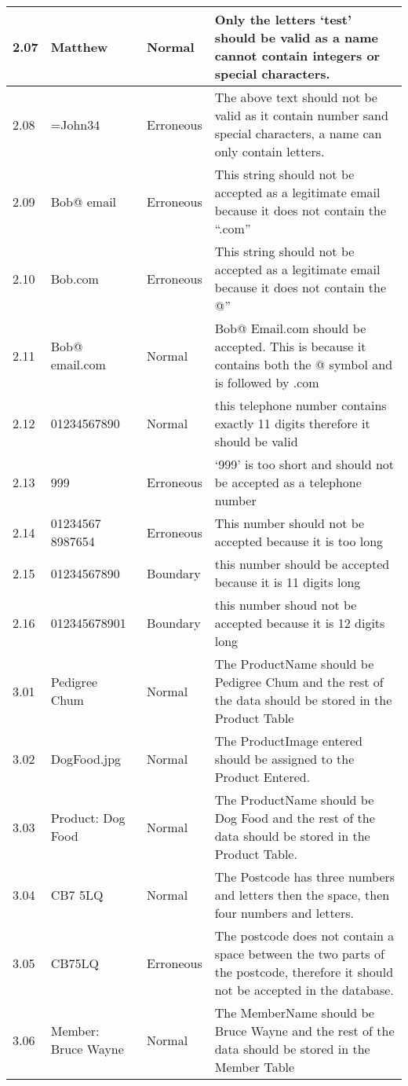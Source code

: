\begin{flushleft}
\begin{longtable}{|p{1.5cm}|p{2.5cm}|p{2cm}|p{4.5cm}|}
	2.07 &  Matthew & Normal & Only the letters `test' should be valid as a name cannot contain integers or special characters. \\ \hline
	2.08 &  =John34 & Erroneous & The above text should not be valid as it contain number sand special characters, a name can only contain letters. \\ \hline
	2.09 &   Bob@ email  & Erroneous & This string should not be accepted as a legitimate email because it does not contain the ``.com'' \\ \hline
	2.10 &  Bob.com& Erroneous &  This string should not be accepted as a legitimate email because it does not contain the @'' \\ \hline
	2.11 &  Bob@ email.com & Normal &  Bob@ Email.com should be accepted. This is because it contains both the @ symbol and is followed by .com \\ \hline
	2.12 &  01234567890 & Normal & this telephone number contains exactly 11 digits therefore it should be valid \\ \hline
	2.13 &  999& Erroneous &  `999' is too short and should not be accepted as a telephone number \\ \hline
	2.14 &  01234567 8987654 & Erroneous & This number should not be accepted because it is too long \\ \hline
	2.15 &  01234567890 & Boundary & this number should be accepted because it is 11 digits long \\ \hline
	2.16 & 012345678901 & Boundary & this number shoud not be accepted because it is 12 digits long \\ \hline
	3.01 &  Pedigree Chum & Normal & The ProductName should be Pedigree Chum and the rest of the data should be stored in the Product Table \\ \hline
	3.02 &  DogFood.jpg & Normal  & The ProductImage entered should be assigned to the Product Entered. \\ \hline
	3.03 &  Product: Dog Food & Normal & The ProductName should be Dog Food and the rest of the data should be stored in the Product Table. \\ \hline
	3.04 &  CB7 5LQ & Normal & The Postcode has three numbers and letters then the space, then four numbers and letters. \\ \hline
	3.05 &  CB75LQ & Erroneous & The postcode does not contain a space between the two parts of the postcode, therefore it should not be accepted in the database.\\ \hline
	3.06 &  Member: Bruce Wayne & Normal & The MemberName should be Bruce Wayne  and the rest of the data should be stored in the Member Table \\ \hline

\end{longtable}
\end{flushleft}
